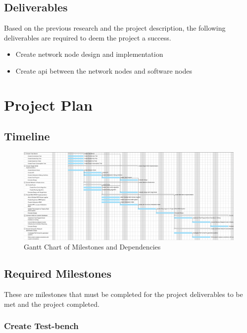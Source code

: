 \documentclass[paper=a4, fontsize=11pt, bibliography=totocnumbered]{scrartcl}
\numberwithin{equation}{section}		%
\numberwithin{figure}{section}			%
\numberwithin{table}{section}				%
\begin{document}
\subsection{Deliverables} \label{subsec:deliverables}

Based on the previous research and the project description, the following deliverables are required to deem the project a success.

\begin{itemize}\label{list:deliverables}
\item Create \gls{network node} design and implementation
\item Create \gls{api} between the \glspl{network node} and \glspl{software node}
\end{itemize}

\section{Project Plan}

\subsection{Timeline}

\begin{figure}[H]
\centering
\includegraphics[angle=90,origin=c,height=0.6\textheight]{gantt-1.png}
\caption{Gantt Chart of Milestones and Dependencies}
\label{fig:gantt}
\end{figure}

\subsection{Required Milestones}

These are milestones that must be completed for the project deliverables to be met and the project completed.

\subsubsection{Create Test-bench}
\end{document}
